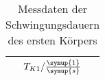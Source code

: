 \begin{table}[h!]
  \centering
  \caption{Messdaten der Schwingungsdauern des ersten Körpers}
  \label{tab:körper1}
  \begin{tabular}{c}
    \toprule
     $T_{K1}/\frac{\symup{1}}{\symup{s}}$\\
    \midrule
      
    \bottomrule
  \end{tabular}
\end{table}
